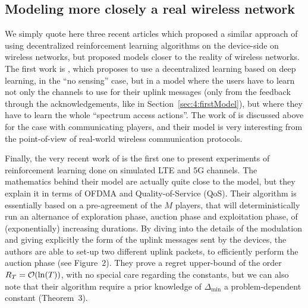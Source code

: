 


\subsection{Modeling more closely a real wireless network}
\label{sub:5:moreRealisticModels}

We simply quote here three recent articles which proposed a similar approach of using decentralized reinforcement learning algorithms on the device-side on wireless networks,
but proposed models closer to the reality of wireless networks.
%
The first work is \cite{NaparstekCohen17}, which proposes to use a decentralized learning based on deep learning, in the ``no sensing'' case, but in a model where the users have to learn not only the channels to use for their uplink messages (only from the feedback through the acknowledgements, like in Section~\ref{sec:4:firstModel}), but where they have to learn the whole ``spectrum access actions''.
%
%
The work of \cite{AvnerMannor18} is discussed above for the case with communicating players, and their model is very interesting from the point-of-view of real-world wireless communication protocols.

Finally, the very recent work of \cite{Zafaruddin2019} is the first one to present experiments of reinforcement learning done on simulated LTE and 5G channels.
The mathematics behind their model are actually quite close to the model, but they explain it in terms of OFDMA and Quality-of-Service (QoS).
Their algorithm is essentially based on a pre-agreement of the $M$ players, that will deterministically run an alternance of exploration phase, auction phase and exploitation phase, of (exponentially) increasing durations.
By diving into the details of the modulation and giving explicitly the form of the uplink messages sent by the devices, the authors are able to set-up two different uplink packets, to efficiently perform the auction phase (see Figure~2).
They prove a regret upper-bound of the order $R_T = \mathop{}\mathopen{}\mathcal{O}\mathopen{}\left(\ln(T)\right)$, with no special care regarding the constants, but we can also note that their algorithm require a prior knowledge of $\Delta_{\min}$ a problem-dependent constant (Theorem~3).


